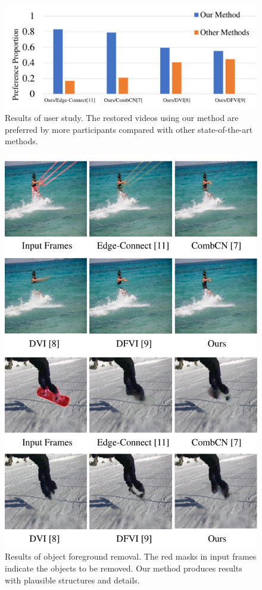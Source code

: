 \begin{figure}[!t]
	\centering
	\includegraphics[width=1.0\columnwidth]{userstudy} %
	\caption{Results of user study. The restored videos using our method are preferred by more participants compared with other state-of-the-art methods. }
	\label{userstudy}
\end{figure}



\begin{figure}[!t]
	\centering
	\includegraphics[width=0.85\columnwidth]{vis_forg} %
	\caption{Results of object foreground removal. The red masks in input frames indicate the objects to be removed. Our method produces results with plausible structures and details.}
	\label{vis_forg}
\end{figure}



